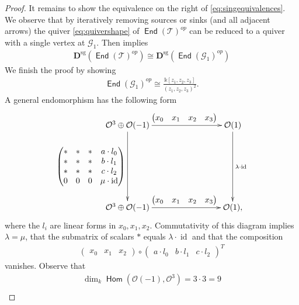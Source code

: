 \documentclass[a4paper,11pt, reqno]{amsart}
\def\DD{\mathbf D}
\def\OO{\mathcal O}
\def\sG{\mathscr{G}}
\def\sT{\mathscr{T}}
\def\id{{\operatorname{id}}}
\newcommand{\opname}[1]{\operatorname{\mathsf{#1}}}
\newcommand{\Hom}{\opname{Hom}}
\newcommand{\End}{\opname{End}}
\newcommand{\op}{^{op}}
\def\Dsg{\DD^{\mathrm{sg}}}
\theoremstyle{plain}
\theoremstyle{definition}
\numberwithin{equation}{section}
\newlength{\arrow}
\begin{document}
\begin{proof}
    It remains to show the equivalence on the right of \eqref{eq:singequivalences}. We observe that by iteratively removing sources or sinks (and all adjacent arrows) the quiver \eqref{eq:quivershape} of $\End(\sT)\op$ can be reduced to a quiver with a single vertex at $\sG_1$. Then \cite[Lemma 4.3.]{chenradical} implies
    \begin{align} 
        \Dsg(\End(\sT)\op) \cong \Dsg(\End(\sG_1)\op)
    \end{align}
    We finish the proof by showing 
    \begin{align}
        \End(\sG_1)\op \cong \frac{\mathbb{k}[z_1, z_2, z_3]}{(z_1, z_2, z_3)^2}.
    \end{align}
    A general endomorphism has the following form
    \begin{align} \label{eq:chainm}
        \xymatrix{
    \OO^3 \oplus \OO(-1) \ar[ddd]_{{\begin{pmatrix}
    * & * &  *  & a\cdot l_0\\ 
    * & * &  *  & b\cdot l_1 \\
    * & * &  *  & c\cdot l_2  \\
     0 & 0 & 0 & \mu \cdot \id  
    \end{pmatrix}}} \ar[rrr]^{\quad \begin{pmatrix} x_0 & x_1 & x_2  & x_3 \end{pmatrix}} &&& \OO(1) 
    \ar[ddd]^{\lambda \cdot \id} 
    \\ \\ \\
    \OO^3 \oplus \OO(-1) \ar[rrr]^{\quad \begin{pmatrix} x_0 & x_1 & x_2 & x_3 \end{pmatrix}} &&& \OO(1), 
    }
    \end{align}
    where the $l_i$ are linear forms in $x_0, x_1, x_2$.
    Commutativity of this diagram implies $\lambda=\mu$, that the submatrix of scalars $*$ equals $\lambda \cdot \id$ and that the composition
    \begin{align}\label{eq:compo}
        \begin{pmatrix} x_0 & x_1 & x_2 \end{pmatrix} \circ \begin{pmatrix}
        a\cdot l_0 & b\cdot l_1  & c\cdot l_2
    \end{pmatrix}^T 
        \end{align}
        vanishes. 
        Observe that \begin{align}
           \dim_k \Hom(\OO(-1), \OO^3) = 3 \cdot 3 =9 \\

\end{align}
\end{proof}
\end{document}
